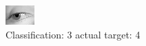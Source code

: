\begin{figure}[h!]
\begin{center}
\includegraphics[width=0.60\columnwidth]{figures/ID2959_class_3_target_4.png}
\end{center}
\caption{ Classification: 3 actual target: 4}
\label{fig:ID2959_class_3_target_4}
\end{figure}
